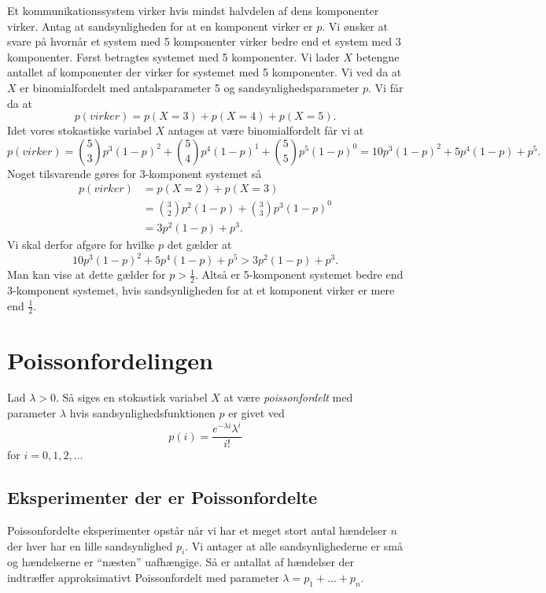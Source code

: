 \begin{eks}[Kommunikationssystemer]
  Et kommunikationssystem virker hvis mindst halvdelen af dens komponenter virker. Antag at sandsynligheden for at en komponent virker er $p$. Vi ønsker at svare på hvornår et system med 5 komponenter virker bedre end et system med 3 komponenter.
  \vspace{14pt}
  Først betragtes systemet med 5 komponenter. Vi lader $X$ betengne antallet af komponenter der virker for systemet med 5 komponenter. Vi ved da at $X$ er binomialfordelt med antalsparameter 5 og sandsynlighedsparameter $p$. Vi får da at
  \[ 
  p(virker) = p(X=3) + p(X=4) + p(X=5)
  .\]
  Idet vores stokastiske variabel $X$ antages at være binomialfordelt får vi at
  \[ 
  p(virker) = \binom{5}{3}p^3(1-p)^2 + \binom{5}{4}p^{4}(1-p)^{1} + \binom{5}{5}p^{5}(1-p)^{0} = 10p^3 (1-p)^2 + 5p^{4}(1-p) + p^{5}
  .\]
  Noget tilsvarende gøres for 3-komponent systemet så
  \begin{align*}
    p(virker) &= p(X=2) + p(X=3) \\
    &= \binom{3}{2}p^2(1-p) + \binom{3}{3}p^3(1-p)^{0} \\
    &= 3p^2(1-p) + p^3
  .\end{align*}
  Vi skal derfor afgøre for hvilke $p$ det gælder at
  \[ 
  10p^3(1-p)^2 + 5p^{4}(1-p) + p^{5} > 3p^2(1-p) + p^3
  .\]
  Man kan vise at dette gælder for $p > \frac{1}{2}$. Altså er 5-komponent systemet bedre end 3-komponent systemet, hvis sandsynligheden for at et komponent virker er mere end $\frac{1}{2}$.
\end{eks}

\section{Poissonfordelingen}
\begin{definition}[Poissonfordelingen] \label{afs:forpoi}
  Lad $\lambda > 0$. Så siges en stokastisk variabel $X$ at være \textit{poissonfordelt} med parameter $\lambda$ hvis sandsynlighedsfunktionen $p$ er givet ved
  \[ 
  p(i) = \frac{e^{-\lambda i}\lambda^{i}}{i!}
  \]
  for $i = 0,1,2,\ldots$
\end{definition}

\subsection{Eksperimenter der er Poissonfordelte}
Poissonfordelte eksperimenter opstår når vi har et meget stort antal hændelser $n$ der hver har en lille sandsynlighed $p_i$. Vi antager at alle sandsynlighederne er små og hændelserne er ``næsten'' uafhængige. Så er antallat af hændelser der indtræffer approksimativt Poissonfordelt med parameter $\lambda = p_1 + \ldots + p_n$. 

